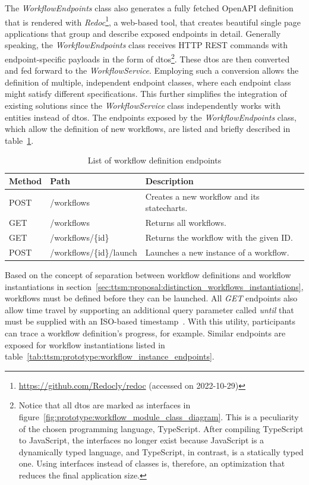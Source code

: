 The \textit{WorkflowEndpoints} class also generates a fully fetched OpenAPI definition that is rendered with \textit{Redoc}\footnote{\url{https://github.com/Redocly/redoc} (accessed on 2022-10-29)}, a web-based tool, that creates beautiful single page applications that group and describe exposed endpoints in detail. Generally speaking, the \textit{WorkflowEndpoints} class receives HTTP REST commands with endpoint-specific payloads in the form of \glspl{dto}\footnote{Notice that all \glspl{dto} are marked as interfaces in figure~\ref{fig:prototype:workflow_module_class_diagram}. This is a peculiarity of the chosen programming language, TypeScript. After compiling TypeScript to JavaScript, the interfaces no longer exist because JavaScript is a dynamically typed language, and TypeScript, in contrast, is a statically typed one. Using interfaces instead of classes is, therefore, an optimization that reduces the final application size.}. These \glspl{dto} are then converted and fed forward to the \textit{WorkflowService}. Employing such a conversion allows the definition of multiple, independent endpoint classes, where each endpoint class might satisfy different specifications. This further simplifies the integration of existing solutions since the \textit{WorkflowService} class independently works with entities instead of \glspl{dto}. The endpoints exposed by the \textit{WorkflowEndpoints} class, which allow the definition of new workflows, are listed and briefly described in table~\ref{tab:ttsm:prototype:workflow_definition_endpoints}.

\begin{table}[h]
\centering
\begin{tabular}{|l|l|l|}
    \hline
    \textbf{Method} & \textbf{Path} & \textbf{Description}\\
    \hline
    POST & /workflows & Creates a new workflow and its statecharts.\\
    GET & /workflows & Returns all workflows.\\
    GET & /workflows/\{id\} & Returns the workflow with the given ID.\\
    POST & /workflows/\{id\}/launch & Launches a new instance of a workflow.\\
    \hline
\end{tabular}
\caption{List of workflow definition endpoints}
\label{tab:ttsm:prototype:workflow_definition_endpoints}
\end{table}

Based on the concept of separation between workflow definitions and workflow instantiations in section~\ref{sec:ttsm:proposal:distinction_workflows_instantiations}, workflows must be defined before they can be launched. All \textit{GET} endpoints also allow time travel by supporting an additional query parameter called \textit{until} that must be supplied with an ISO-based timestamp~\cite{iso_timestamps}. With this utility, participants can trace a workflow definition's progress, for example. Similar endpoints are exposed for workflow instantiations listed in table~\ref{tab:ttsm:prototype:workflow_instance_endpoints}.

